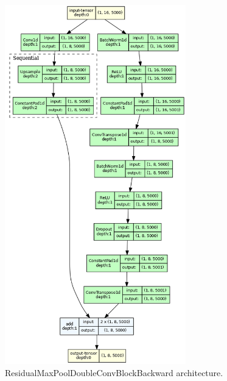 \documentclass[a4paper,10pt]{article}
\begin{document}
\begin{figure}[p]
	\centering
	\includegraphics[width=0.7\textwidth]{ResidualMaxPoolDoubleConvBlockBackward.gv.png}
	\caption{ResidualMaxPoolDoubleConvBlockBackward architecture.}
	\label{fig:resbw_architecture}
\end{figure}
\end{document}

